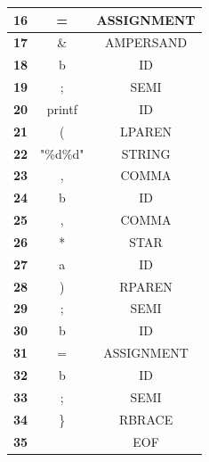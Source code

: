 \documentclass{article}
\begin{document}
\begin{latin}
\begin{longtable}[c]{|c|c|c|}
\textbf{16} & =                       & ASSIGNMENT    \\ \hline
\textbf{17} & \&                      & AMPERSAND     \\ \hline
\textbf{18} & b                       & ID            \\ \hline
\textbf{19} & ;                       & SEMI          \\ \hline
\textbf{20} & printf                  & ID            \\ \hline
\textbf{21} & (                       & LPAREN        \\ \hline
\textbf{22} & "\%d\%d"                & STRING        \\ \hline
\textbf{23} & ,                       & COMMA         \\ \hline
\textbf{24} & b                       & ID            \\ \hline
\textbf{25} & ,                       & COMMA         \\ \hline
\textbf{26} & *                       & STAR          \\ \hline
\textbf{27} & a                       & ID            \\ \hline
\textbf{28} & )                       & RPAREN        \\ \hline
\textbf{29} & ;                       & SEMI          \\ \hline
\textbf{30} & b                       & ID            \\ \hline
\textbf{31} & =                       & ASSIGNMENT    \\ \hline
\textbf{32} & b                       & ID            \\ \hline
\textbf{33} & ;                       & SEMI          \\ \hline
\textbf{34} & \} & RBRACE      				  \\ \hline
\textbf{35} &                         & EOF           \\ \hline
\end{longtable}
\end{latin}
\end{document}
